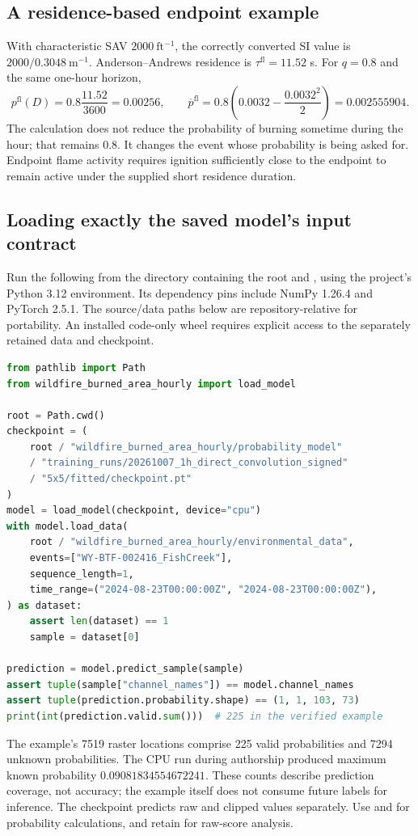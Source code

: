 \documentclass[11pt,a4paper]{article}
\begin{document}
\subsection{A residence-based endpoint example}
With characteristic SAV $2000\ \mathrm{ft^{-1}}$, the correctly converted SI
value is $2000/0.3048\ \mathrm{m^{-1}}$. Anderson--Andrews residence is
$\tau^{\mathrm{fl}}=11.52$ s. For $q=0.8$ and the same one-hour horizon,
\begin{equation}
p^{\mathrm{fl}}(D)=0.8\frac{11.52}{3600}=0.00256,
\qquad
\overline p^{\mathrm{fl}}
=0.8\left(0.0032-\frac{0.0032^2}{2}\right)=0.002555904.
\end{equation}
The calculation does not reduce the probability of burning sometime during
the hour; that remains 0.8. It changes the event whose probability is being
asked for. Endpoint flame activity requires ignition sufficiently close to
the endpoint to remain active under the supplied short residence duration.

\subsection{Loading exactly the saved model's input contract}
Run the following from the directory containing the root 
and , using the project's Python 3.12 environment. Its
dependency pins include NumPy 1.26.4 and PyTorch 2.5.1. The source/data paths
below are repository-relative for portability. An installed code-only wheel
requires explicit access to the separately retained data and checkpoint.
\begin{lstlisting}[language=Python]
from pathlib import Path
from wildfire_burned_area_hourly import load_model

root = Path.cwd()
checkpoint = (
    root / "wildfire_burned_area_hourly/probability_model"
    / "training_runs/20261007_1h_direct_convolution_signed"
    / "5x5/fitted/checkpoint.pt"
)
model = load_model(checkpoint, device="cpu")
with model.load_data(
    root / "wildfire_burned_area_hourly/environmental_data",
    events=["WY-BTF-002416_FishCreek"],
    sequence_length=1,
    time_range=("2024-08-23T00:00:00Z", "2024-08-23T00:00:00Z"),
) as dataset:
    assert len(dataset) == 1
    sample = dataset[0]

prediction = model.predict_sample(sample)
assert tuple(sample["channel_names"]) == model.channel_names
assert tuple(prediction.probability.shape) == (1, 1, 103, 73)
print(int(prediction.valid.sum()))  # 225 in the verified example
\end{lstlisting}
The example's 7519 raster locations comprise 225 valid probabilities and 7294
unknown probabilities. The CPU run during authorship produced maximum known
probability $0.09081834554672241$. These counts describe prediction coverage,
not accuracy; the example itself does not consume future labels for inference.
The checkpoint predicts raw and clipped values separately. Use
 and  for probability
calculations, and retain  for raw-score analysis.
\end{document}

